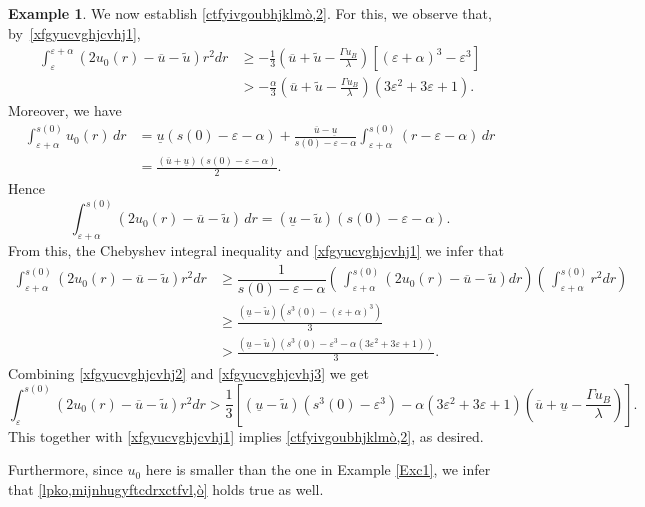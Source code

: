 \documentclass[12pt,a4paper,intlimits,sumlimits]{amsart}
\theoremstyle{definition}
\newtheorem{example}[definition]{Example}
\theoremstyle{plain}
\numberwithin{equation}{section}
\renewcommand{\geq}{\geqslant}
\renewcommand{\ge}{\geqslant}
\begin{document}
\begin{appendix}
\begin{example}
We now establish \eqref{ctfyivgoubhjklmò,2}. For this, we observe that, by~\eqref{xfgyucvghjcvhj1},
\begin{equation}\label{xfgyucvghjcvhj2}
\begin{aligned}
\int_\varepsilon^{\varepsilon+\alpha}(2u_0(r)-\overline u -\widetilde u)r^2dr&\geq -\frac{1}{3}\left(\overline u+\widetilde u -\frac{\Gamma u_B}{\lambda}\right)[(\varepsilon+\alpha)^3-\varepsilon^3] \\
&>-\frac{\alpha}{3}\left(\overline u+\widetilde u -\frac{\Gamma u_B}{\lambda}\right)(3\varepsilon^2+3\varepsilon+1).
\end{aligned}
\end{equation}
Moreover, we have
\[
\begin{aligned}
\int_{\varepsilon+\alpha}^{s(0)} u_0(r)\,dr &=\underline u (s(0)-\varepsilon-\alpha)+\frac{\overline u-\underline u}{s(0)-\varepsilon-\alpha}\int_{\varepsilon+\alpha}^{s(0)} (r-\varepsilon-\alpha)\,dr \\
&=\frac{(\overline u+\underline u)(s(0)-\varepsilon-\alpha)}{2}.
\end{aligned}
\]
Hence
\[
\int_{\varepsilon+\alpha}^{s(0)} (2u_0(r)-\overline u -\widetilde u)\,dr = (\underline u-\widetilde u)(s(0)-\varepsilon-\alpha).
\]
From this, the Chebyshev integral inequality and \eqref{xfgyucvghjcvhj1} we infer that
\begin{equation}\label{xfgyucvghjcvhj3}
\begin{aligned}
\int_{\varepsilon+\alpha}^{s(0)} (2u_0(r)-\overline u -\widetilde u)r^2dr &\ge\dfrac{1}{s(0)-\varepsilon-\alpha}\left(\,\int_{\varepsilon+\alpha}^{s(0)} (2 u_0(r)-\overline u-\widetilde u) dr\right)\left(\,\int_{\varepsilon+\alpha}^{s(0)} r^2 dr\right)\\
&\ge \frac{(\underline u -\widetilde u)(s^3(0)-(\varepsilon+\alpha)^3)}{3} \\
&>\frac{(\underline u -\widetilde u)(s^3(0)-\varepsilon^3-\alpha(3\varepsilon^2+3\varepsilon+1))}{3}.
\end{aligned}
\end{equation}
Combining \eqref{xfgyucvghjcvhj2} and \eqref{xfgyucvghjcvhj3} we get
\[
\int_{\varepsilon}^{s(0)} (2u_0(r)-\overline u -\widetilde u)r^2dr >  \frac{1}{3}\left[(\underline u -\widetilde u)(s^3(0)-\varepsilon^3)-\alpha(3\varepsilon^2+3\varepsilon+1)\left(\overline u+\underline u -\frac{\Gamma u_B}{\lambda}\right)\right].
\]
This together with \eqref{xfgyucvghjcvhj1} implies \eqref{ctfyivgoubhjklmò,2}, as desired.

Furthermore, since $u_0$ here is smaller than the one in Example \ref{Exc1}, we infer that \eqref{lpko,mijnhugyftcdrxctfvl,ò} holds true as well.
\end{example}




\end{appendix}
\end{document}
